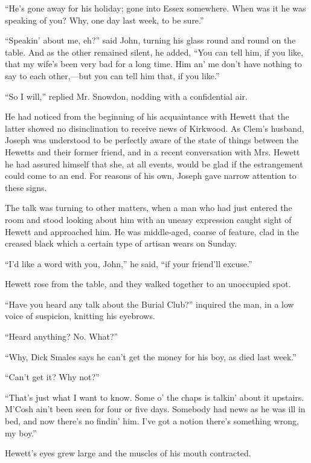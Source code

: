 ``He's gone away for his holiday; gone into
{\protect\hypertarget{156}{}{}}Essex somewhere. When was it he was
speaking of you? Why, one day last week, to be sure.''

``Speakin' about me, eh?'' said John, turning his glass round and round
on the table. And as the other remained silent, he added, ``You can tell
him, if you like, that my wife's been very bad for a long time. Him an'
me don't have nothing to say to each other,---but you can tell him that,
if you like.''

``So I will,'' replied Mr. Snowdon, nodding with a confidential air.

He had noticed from the beginning of his acquaintance with Hewett that
the latter showed no disinclination to receive news of Kirkwood. As
Clem's husband, Joseph was understood to be perfectly aware of the state
of things between the Hewetts and their former friend, and in a recent
conversation with Mrs. Hewett he had assured himself that she, at all
events, would be glad if the estrangement could come to an end. For
reasons of his own, Joseph gave narrow attention to these signs.

{\protect\hypertarget{157}{}{}}The talk was turning to other matters,
when a man who had just entered the room and stood looking about him
with an uneasy expression caught sight of Hewett and approached him. He
was middle-aged, coarse of feature, clad in the creased black which a
certain type of artisan wears on Sunday.

``I'd like a word with you, John,'' he said, ``if your friend'll
excuse.''

Hewett rose from the table, and they walked together to an unoccupied
spot.

``Have you heard any talk about the Burial Club?'' inquired the man, in
a low voice of suspicion, knitting his eyebrows.

``Heard anything? No. What?''

``Why, Dick Smales says he can't get the money for his boy, as died last
week.''

``Can't get it? Why not?''

``That's just what I want to know. Some o' the chaps is talkin' about it
upstairs. M'Cosh ain't been seen for four or five days. Somebody had
news as he was ill in bed, and now there's no findin' him. I've got a
notion there's something wrong, my boy.''

{\protect\hypertarget{158}{}{}}Hewett's eyes grew large and the muscles
of his mouth contracted.

